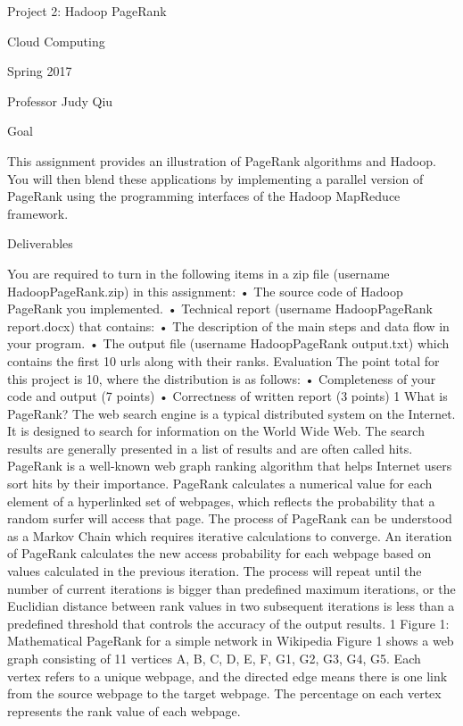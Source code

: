Project 2: Hadoop PageRank

Cloud Computing

Spring 2017

Professor Judy Qiu

Goal

This assignment provides an illustration of PageRank algorithms and Hadoop. You will then blend these
applications by implementing a parallel version of PageRank using the programming interfaces of the Hadoop
MapReduce framework.

Deliverables

You are required to turn in the following items in a zip file (username HadoopPageRank.zip) in this assignment:
• The source code of Hadoop PageRank you implemented.
• Technical report (username HadoopPageRank report.docx) that contains:
• The description of the main steps and data flow in your program.
• The output file (username HadoopPageRank output.txt) which contains the first 10 urls along with
their ranks.
Evaluation
The point total for this project is 10, where the distribution is as follows:
• Completeness of your code and output (7 points)
• Correctness of written report (3 points)
1 What is PageRank?
The web search engine is a typical distributed system on the Internet. It is designed to search for information
on the World Wide Web. The search results are generally presented in a list of results and are often called
hits. PageRank is a well-known web graph ranking algorithm that helps Internet users sort hits by their
importance.
PageRank calculates a numerical value for each element of a hyperlinked set of webpages, which reflects
the probability that a random surfer will access that page. The process of PageRank can be understood as a
Markov Chain which requires iterative calculations to converge. An iteration of PageRank calculates the new
access probability for each webpage based on values calculated in the previous iteration. The process will
repeat until the number of current iterations is bigger than predefined maximum iterations, or the Euclidian
distance between rank values in two subsequent iterations is less than a predefined threshold that controls
the accuracy of the output results.
1
Figure 1: Mathematical PageRank for a simple network in Wikipedia
Figure 1 shows a web graph consisting of 11 vertices A, B, C, D, E, F, G1, G2, G3, G4, G5. Each vertex
refers to a unique webpage, and the directed edge means there is one link from the source webpage to the
target webpage. The percentage on each vertex represents the rank value of each webpage.
